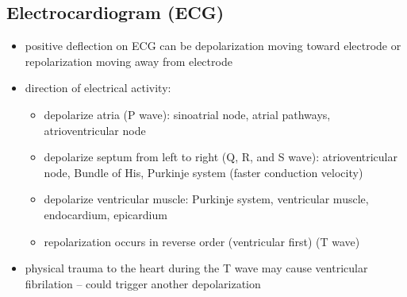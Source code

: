 \documentclass[10pt]{article}
\begin{document}
\subsection{Electrocardiogram (ECG)}
\begin{itemize}
    \item positive deflection on ECG can be depolarization moving toward electrode or repolarization moving away from electrode
    \item direction of electrical activity: 
        \begin{itemize}
            \item depolarize atria (P wave): sinoatrial node, atrial pathways, atrioventricular node
            \item depolarize septum from left to right (Q, R, and S wave): atrioventricular node, Bundle of His, Purkinje system (faster conduction velocity)
            \item depolarize ventricular muscle: Purkinje system, ventricular muscle, endocardium, epicardium
            \item repolarization occurs in reverse order (ventricular first) (T wave)
        \end{itemize}
    \item physical trauma to the heart during the T wave may cause ventricular fibrilation -- could trigger another depolarization
\end{itemize}
\end{document}
